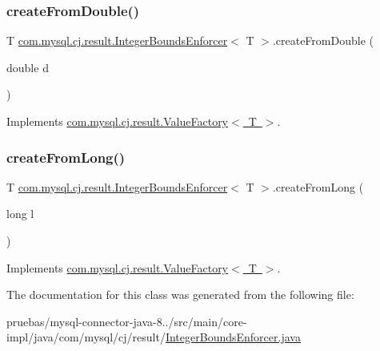 \subsubsection{\texorpdfstring{create\+From\+Double()}{createFromDouble()}}
{\footnotesize\ttfamily T \mbox{\hyperlink{classcom_1_1mysql_1_1cj_1_1result_1_1_integer_bounds_enforcer}{com.\+mysql.\+cj.\+result.\+Integer\+Bounds\+Enforcer}}$<$ T $>$.create\+From\+Double (\begin{DoxyParamCaption}\item[{double}]{d }\end{DoxyParamCaption})}



Implements \mbox{\hyperlink{interfacecom_1_1mysql_1_1cj_1_1result_1_1_value_factory_a9977e0c9d2bb9e306ee4a5a2ead6840c}{com.\+mysql.\+cj.\+result.\+Value\+Factory$<$ T $>$}}.

\mbox{\label{classcom_1_1mysql_1_1cj_1_1result_1_1_integer_bounds_enforcer_a7c096b3f99fcd5043d9fba39c621eec2}} 
\subsubsection{\texorpdfstring{create\+From\+Long()}{createFromLong()}}
{\footnotesize\ttfamily T \mbox{\hyperlink{classcom_1_1mysql_1_1cj_1_1result_1_1_integer_bounds_enforcer}{com.\+mysql.\+cj.\+result.\+Integer\+Bounds\+Enforcer}}$<$ T $>$.create\+From\+Long (\begin{DoxyParamCaption}\item[{long}]{l }\end{DoxyParamCaption})}



Implements \mbox{\hyperlink{interfacecom_1_1mysql_1_1cj_1_1result_1_1_value_factory_a48c32868f2e3efac502522211a40f642}{com.\+mysql.\+cj.\+result.\+Value\+Factory$<$ T $>$}}.



The documentation for this class was generated from the following file\+:\begin{DoxyCompactItemize}
\item 
pruebas/mysql-\/connector-\/java-\/8../src/main/core-\/impl/java/com/mysql/cj/result/\mbox{\hyperlink{_integer_bounds_enforcer_8java}{Integer\+Bounds\+Enforcer.\+java}}\end{DoxyCompactItemize}
